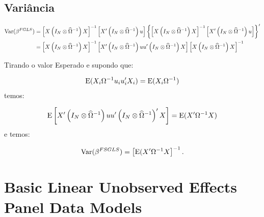\documentclass[11pt, oneside, a4paper, article]{article}
\numberwithin{equation}{section}
\begin{document}
\subsection*{Variância}

\vspace{-1 em}
\begin{align*}
\text{Var}(\beta^{FGLS})
&= 
\left[ X \left( I_{N} \otimes \widehat{\Omega}^{-1} \right) X \right]^{-1}
\left[ X' \left( I_{N} \otimes \widehat{\Omega}^{-1} \right) u \right]
\left\{ 
\left[ X \left( I_{N} \otimes \widehat{\Omega}^{-1} \right) X \right]^{-1}
\left[ X' \left( I_{N} \otimes \widehat{\Omega}^{-1} \right) u \right]
\right\}^{\prime}
\\
&=
\left[ X \left( I_{N} \otimes \widehat{\Omega}^{-1} \right) X \right]^{-1}
\left[
X' \left( I_{N} \otimes \widehat{\Omega}^{-1} \right) 
u u'
\left( I_{N} \otimes \widehat{\Omega}^{-1} \right) X
\right]
\left[ X \left( I_{N} \otimes \widehat{\Omega}^{-1} \right) X \right]^{-1}
\end{align*}

Tirando o valor Esperado e supondo que:

\vspace{-1.5 em}
\begin{align*}
\text{E}(X_{i} \Omega^{-1} u_{i} u_{i}' X_{i}) = \text{E}(X_{i} \Omega^{-1})
\end{align*}
temos:

\vspace{-1.5 em}
\begin{align*}
\text{E}\left[ X' \left( I_{N} \otimes \widehat{\Omega}^{-1} \right)
	u u'
\left( I_{N} \otimes \widehat{\Omega}^{-1} \right)' X \right]
=
\text{E}(X' \Omega^{-1} X)
\end{align*}
e temos:

\vspace{-1.5 em}
\begin{align*}
	\text{Var}(\beta^{FSGLS}) = \left[ \text{E}(X' \Omega^{-1} X \right]^{-1}.
\end{align*}


\clearpage
\section{Basic Linear Unobserved Effects Panel Data Models}
\noindent
\citet[C.10, pp.247--291 ]{wool-2010}
\end{document}
